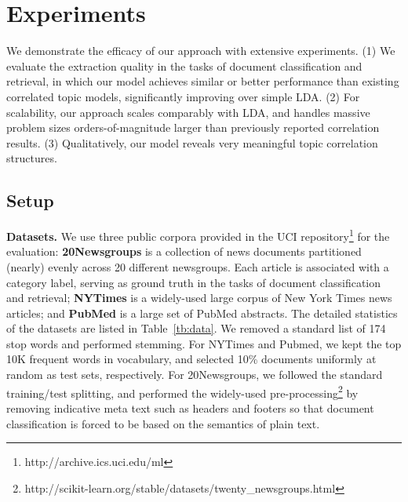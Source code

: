 \documentclass[sigconf]{acmart}
\begin{document}
\section{Experiments}\label{sec:exp}
We demonstrate the efficacy of our approach with extensive experiments. (1) We evaluate the extraction quality in the tasks of document classification and retrieval, in which our model achieves similar or better performance than existing correlated topic models, significantly improving over simple LDA. (2) For scalability, our approach scales comparably with LDA, and handles massive problem sizes orders-of-magnitude larger than previously reported correlation results. (3) Qualitatively, our model reveals very meaningful topic correlation structures.

\subsection{Setup}
\textbf{Datasets. }We use three public corpora provided in the UCI repository\footnote{http://archive.ics.uci.edu/ml} for the evaluation: {\bf 20Newsgroups} is a collection of news documents partitioned (nearly) evenly across 20 different newsgroups. Each article is associated with a category label, serving as ground truth in the tasks of document classification and retrieval; {\bf NYTimes} is a widely-used large corpus of New York Times news articles; and {\bf PubMed} is a large set of PubMed abstracts.
%
The detailed statistics of the datasets are listed in Table~\ref{tb:data}. We removed a standard list of 174 stop words and performed stemming. For NYTimes and Pubmed, we kept the top 10K frequent words in vocabulary, and selected 10\% documents uniformly at random as test sets, respectively. For 20Newsgroups, we followed the standard training/test splitting, and performed the widely-used pre-processing\footnote{http://scikit-learn.org/stable/datasets/twenty\_newsgroups.html} by removing indicative meta text such as headers and footers so that document classification is forced to be based on the semantics of plain text.
\end{document}
